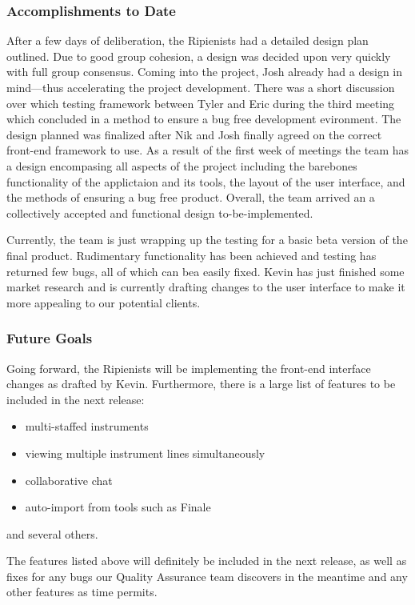 \documentclass[12pt]{article}
\begin{document}
\subsubsection{Accomplishments to Date}
After a few days of deliberation, the Ripienists had a detailed design plan outlined. Due to good group cohesion, a design was decided upon very quickly with full group consensus. Coming into the project, Josh already had a design in mind---thus accelerating the project development. There was a short discussion over which testing framework between Tyler and Eric during the third meeting which concluded in a method to ensure a bug free development evironment. The design planned was finalized after Nik and Josh finally agreed on the correct front-end framework to use. As a result of the first week of meetings the team has a design encompasing all aspects of the project including the barebones functionality of the applictaion and its tools, the layout of the user interface, and the methods of ensuring a bug free product. Overall, the team arrived an a collectively accepted and functional design to-be-implemented.

Currently, the team is just wrapping up the testing for a basic beta version of the final product. Rudimentary functionality has been achieved and testing has returned few bugs, all of which can bea easily fixed. Kevin has just finished some market research and is currently drafting changes to the user interface to make it more appealing to our potential clients.

\subsubsection{Future Goals}
Going forward, the Ripienists will be implementing the front-end interface changes as drafted by Kevin. Furthermore, there is a large list of features to be included in the next release:
\begin{itemize}
\item multi-staffed instruments
\item viewing multiple instrument lines simultaneously
\item collaborative chat
\item auto-import from tools such as Finale
\end{itemize}
and several others.

The features listed above will definitely be included in the next release, as well as fixes for any bugs our Quality Assurance team discovers in the meantime and any other features as time permits.
\end{document}
